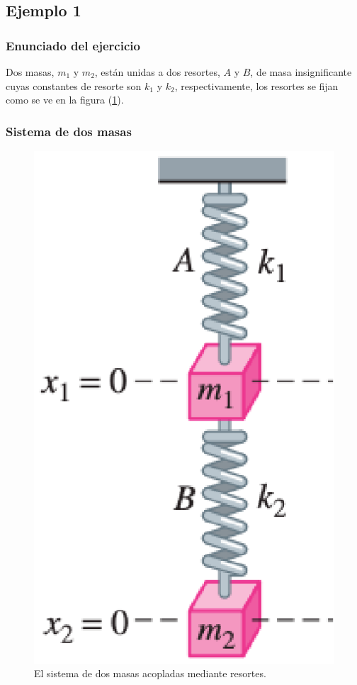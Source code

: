 \subsection{Ejemplo 1}
\begin{frame}
\frametitle{Enunciado del ejercicio}
Dos masas, $m_{1}$ y $m_{2}$, están unidas a dos resortes, $A$ y $B$, de masa insignificante cuyas constantes de resorte son $k_{1}$ y $k_{2}$, respectivamente, los resortes se fijan como se ve en la figura (\ref{fig:figura_dos_masas_01}).
\end{frame}
\begin{frame}
\frametitle{Sistema de dos masas}
\begin{figure}
    \centering
    \includegraphics[scale=0.35]{Imagenes/Ejercicio_Dos_Masas_01.eps}
    \caption{El sistema de dos masas acopladas mediante resortes.}
    \label{fig:figura_dos_masas_01}
\end{figure}
\end{frame}
